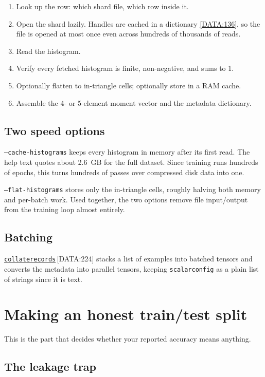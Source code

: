 \documentclass[11pt,a4paper]{report}
\newcommand{\srcbase}{vscode://file/Users/syellapa/Documents/Research/2026/ANSYS/Multi-ScalarPDF}
\newcommand{\dmdn}{dirichlet\string_mdn}
\newcommand{\srctag}[1]{{\footnotesize\textcolor{TagGray}{[#1]}}}
\newcommand{\Data}[2]{\href{\srcbase/\dmdn/data.py:#1}{\texttt{#2}}\,\srctag{DATA:#1}}
\newcommand{\DataL}[1]{\href{\srcbase/\dmdn/data.py:#1}{\srctag{DATA:#1}}}
\newcommand{\code}[1]{\texttt{#1}}
\renewcommand{\_}{\origtextunderscore\allowbreak}
\begin{document}
\begin{enumerate}
  \item Look up the row: which shard file, which row inside it.
  \item Open the shard lazily. Handles are cached in a dictionary \DataL{136}, so the file is
        opened at most once even across hundreds of thousands of reads.
  \item Read the histogram.
  \item Verify every fetched histogram is finite, non-negative, and sums to 1.
  \item Optionally flatten to in-triangle cells; optionally store in a RAM cache.
  \item Assemble the 4- or 5-element moment vector and the metadata dictionary.
\end{enumerate}

\subsection*{Two speed options}

\code{--cache-histograms} keeps every histogram in memory after its first read. The help text
quotes about 2.6~GB for the full dataset. Since training runs hundreds of epochs, this turns
hundreds of passes over compressed disk data into one.

\code{--flat-histograms} stores only the in-triangle cells, roughly halving both memory and
per-batch work. Used together, the two options remove file input/output from the training loop
almost entirely.

\subsection*{Batching}

\Data{224}{collate\_records} stacks a list of examples into batched tensors and converts the
metadata into parallel tensors, keeping \code{scalar\_config} as a plain list of strings since
it is text.

\section{Making an honest train/test split}

This is the part that decides whether your reported accuracy means anything.

\subsection*{The leakage trap}
\end{document}
